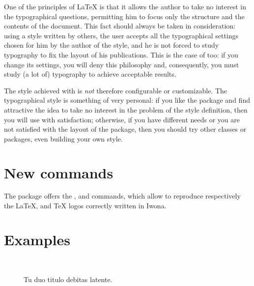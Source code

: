 One of the principles of \LaTeX{} is that it allows the author to take no interest in the typographical questions, permitting him to focus only the structure and the contents of the document. This fact should always be taken in consideration: using a style written by others, the user accepts all the typographical settings chosen for him by the author of the style, and he is not forced to study typography to fix the layout of his publications. This is the case of \arsclassica{} too: if you change its settings, you will deny this philosophy and, consequently, you must study (a lot of) typography to achieve acceptable results. 

The style achieved with \arsclassica{} is \emph{not} therefore configurable or customizable. The typographical style is something of very personal: if you like the package and find attractive the idea to take no interest in the problem of the style definition, then you will use \arsclassica{} with satisfaction; otherwise, if you have different needs or you are not satisfied with the layout of the package, then you should try other classes or packages, even building your own style.



\section{New commands}

The package offers the ,  and  commands, which allow to reproduce respectively the \LaTeX, \LaTeXe{} and \TeX{} logos correctly written in Iwona.






\section{Examples}

\begin{figure}
\centering
{} \quad
{} \\
 \quad
{}
\caption[Tu duo titulo debitas latente.]{Tu duo titulo debitas
latente.}\label{fig:example}
\end{figure}

